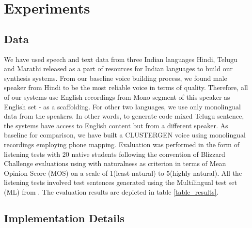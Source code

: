 \section{Experiments}
\label{mixed_systems}

\subsection{Data}

We have used speech and text data from three Indian languages Hindi, Telugu and Marathi released as a part of resources for Indian languages \cite{indic_dataset} to build our synthesis systems. From our baseline voice building process, we found male speaker from Hindi to be the most reliable voice in terms of quality. Therefore, all of our systems use English recordings from  Mono segment of this speaker as English set - as a scaffolding. For  other two languages, we use only monolingual data from the speakers. In other words, to generate code mixed Telugu sentence, the systems have access to English content but from a different speaker. As baseline for comparison, we have built a CLUSTERGEN voice using monolingual recordings employing phone mapping. Evaluation was performed in the form of listening tests with 20 native students following the convention of Blizzard Challenge evaluations using \cite{parlikar2012testvox} with naturalness as criterion in  terms of Mean Opinion Score (MOS) on a scale of 1(least natural) to 5(highly natural). All the listening tests involved test sentences generated using the Multilingual test set (ML) from \cite{prahallad2014blizzard}. The evaluation results are depicted in table \ref{table_results}.

\subsection{Implementation Details}

